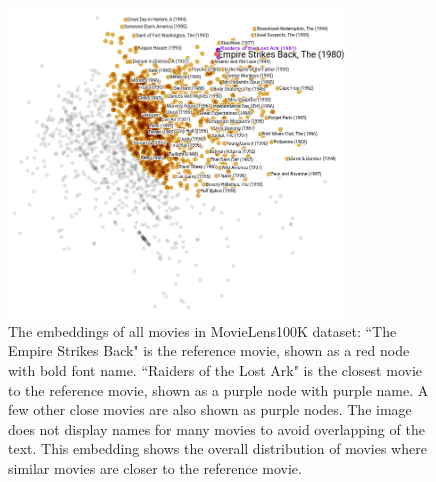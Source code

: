 \documentclass[12pt]{WSUThesis}
\theoremstyle{definition}
\begin{document}
\begin{figure}[!ht]\centering
	\includegraphics[width=0.8\textwidth]{movies-annotation}
	\caption{
		The embeddings of all movies in MovieLens100K dataset:
		``The Empire Strikes Back" is the reference movie, shown as a red node with bold font name.
		``Raiders of the Lost Ark" is the closest movie to the reference movie, shown as a purple node with purple name.
		A few other close movies are also shown as purple nodes.
		The image does not display names for many movies to avoid overlapping of the text.
		This embedding shows the overall distribution of movies where similar movies are closer to the reference movie.
	}
	\label{fig:movies}
\end{figure}
\end{document}
